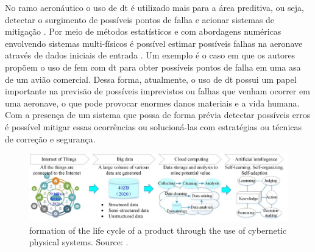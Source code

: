 No ramo aeronáutico o uso de \acrshort{dt} é utilizado mais para a área preditiva, ou seja, detectar o surgimento de possíveis pontos de falha e acionar sistemas de mitigação \cite{Barricelli2019}. Por meio de métodos estatísticos e com abordagens numéricas envolvendo sistemas  multi-físicos é possível estimar possíveis falhas na aeronave através de dados iniciais de entrada \cite{Benjamin2012}. Um exemplo é o caso em que os autores \textcite{Bielefeldt2015} propõem o uso de \acrlong{fem} com \acrshort{dt} para obter possíveis pontos de falha em uma asa de um avião comercial. Dessa forma, atualmente, o uso de \acrshort{dt} possui um papel importante na previsão de possíveis imprevistos ou falhas que venham ocorrer em uma aeronave, o que pode provocar enormes danos materiais e a vida humana. Com a presença de um sistema que possa de forma prévia detectar possíveis erros é possível mitigar essas ocorrências ou solucioná-las com estratégias ou técnicas de correção e segurança. 

\begin{figure}[h!]
    \centering
    \includegraphics[scale=0.75]{images/Related/cps.png}
    \caption{formation of the life cycle of a product through the use of cybernetic physical systems. Source: \cite{Qi2018}.}

    \label{fig:digitalTwinBigData}
\end{figure}


